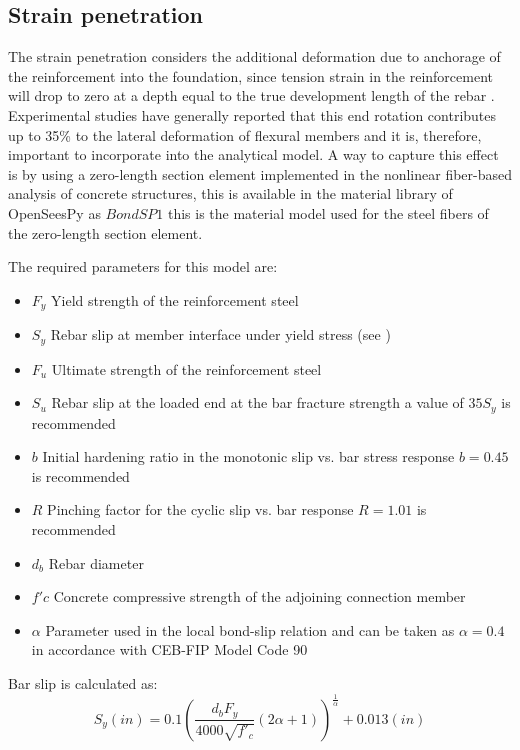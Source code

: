 \subsection{Strain penetration}

The strain penetration considers the additional deformation due to anchorage of the reinforcement into the foundation, since tension strain in the reinforcement will drop to zero at a depth equal to the true development length of the rebar \cite{Priestley2007}. Experimental studies have generally reported that this end rotation contributes up to 35\% to the lateral deformation of flexural members\cite{Zhao2007} and it is, therefore, important to incorporate into the analytical model. A way to capture this effect is by using a zero-length section element implemented in the nonlinear fiber-based analysis of concrete structures, this is available in the material library of OpenSeesPy as $Bond SP1$ \cite{Zhao2007} this is the material model used for the steel fibers of the zero-length section element.

The required parameters for this model are:
\begin{itemize}
	\item $F_{y}$ Yield strength of the reinforcement steel
	\item $S_{y}$ Rebar slip at member interface under yield stress (see )
	\item $F_{u}$ Ultimate strength of the reinforcement steel
	\item $S_{u}$ Rebar slip at the loaded end at the bar fracture strength a value of $35 S_{y}$ is recommended \cite{Zhao2007}
	\item $b$ Initial hardening ratio in the monotonic slip vs. bar stress response $b=0.45$ is recommended \cite{Zhao2007}
	\item $R$ Pinching factor for the cyclic slip vs. bar response $R=1.01$ is recommended \cite{Zhao2007}
	\item $d_b$ Rebar diameter
	\item $f'c$ Concrete compressive strength of the adjoining connection member
	\item $\alpha$ Parameter used in the local bond-slip relation and can be taken as $\alpha=0.4$ in accordance with CEB-FIP Model Code 90 \cite{CEB1993}
\end{itemize}

Bar slip is calculated as:
\begin{equation}
	S_{y}(in)=0.1\left(\frac{d_{b}F_{y}}{4000\sqrt{f'_{c}}}\left(2\alpha+1\right)\right)^{\frac{1}{\alpha}}+0.013 (in)
	\label{eq.Rebar_Slip}
\end{equation}

